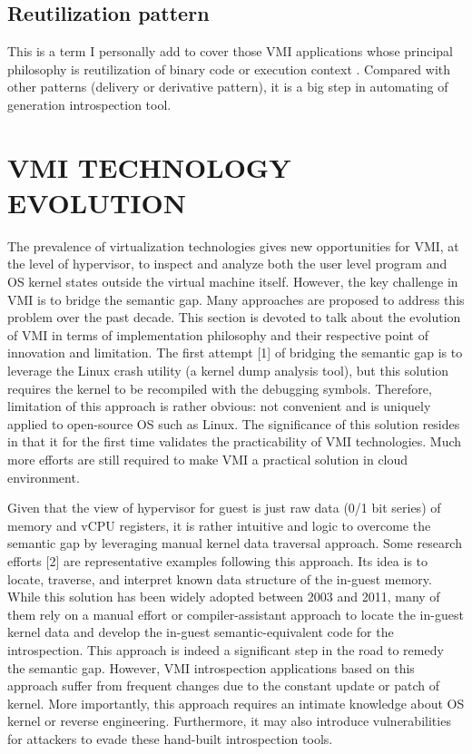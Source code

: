 \subsection{Reutilization pattern}

This is a term I personally add to cover those VMI applications whose principal philosophy is reutilization of binary code or execution context \citep{Reference27, Reference28}. Compared with other patterns (delivery or derivative pattern), it is a big step in automating of generation introspection tool.


\section{VMI TECHNOLOGY EVOLUTION}

The prevalence of virtualization technologies gives new opportunities for VMI, at the level of hypervisor, to inspect and analyze both the user level program and OS kernel states outside the virtual machine itself. However, the key challenge in VMI is to bridge the semantic gap. Many approaches are proposed to address this problem over the past decade. This section is devoted to talk about the evolution of VMI in terms of implementation philosophy and their respective point of innovation and limitation.
The first attempt [1] of bridging the semantic gap is to leverage the Linux crash utility (a kernel dump analysis tool), but this solution requires the kernel to be recompiled with the debugging symbols. Therefore, limitation of this approach is rather obvious: not convenient and is uniquely applied to open-source OS such as Linux. The significance of this solution resides in that it for the first time validates the practicability of VMI technologies. Much more efforts are still required to make VMI a practical solution in cloud environment.

Given that the view of hypervisor for guest is just raw data (0/1 bit series) of memory and vCPU registers, it is rather intuitive and logic to overcome the semantic gap by leveraging manual kernel data traversal approach. Some research efforts [2] are representative examples following this approach. Its idea is to locate, traverse, and interpret known data structure of the in-guest memory. While this solution has been widely adopted between 2003 and 2011, many of them rely on a manual effort or compiler-assistant approach to locate the in-guest kernel data and develop the in-guest semantic-equivalent code for the introspection. This approach is indeed a significant step in the road to remedy the semantic gap. However, VMI introspection applications based on this approach suffer from frequent changes due to the constant update or patch of kernel. More importantly, this approach requires an intimate knowledge about OS kernel or reverse engineering. Furthermore, it may also introduce vulnerabilities for attackers to evade these hand-built introspection tools.

